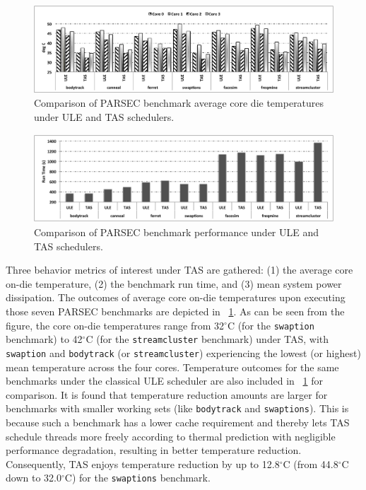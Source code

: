 \documentclass[times, 10pt,twocolumn]{IEEEtran}
\begin{document}
\begin{figure}[tbp] 
\centering
  \includegraphics[width=1.0\linewidth,height=1.3in]{graphics/parsectemp}
  \caption{Comparison of PARSEC benchmark average core die temperatures
under ULE and TAS schedulers.}
  \label{fig:pbenchmarkt}
\end{figure}
\begin{figure}[tbp]
  \includegraphics[width=1.0\linewidth,height=1.3in]{graphics/parsecperformance}
  \caption{Comparison of PARSEC benchmark performance under ULE and TAS
schedulers.}
  \label{fig:pbenchmarkp}
\end{figure} 
Three behavior metrics of interest under TAS are gathered: (1) the
average core on-die temperature, (2) the benchmark run time, and (3)
mean system power dissipation.  The outcomes of average core on-die
temperatures upon executing those seven PARSEC benchmarks are depicted
in \figurename~\ref{fig:pbenchmarkt}.  As can be seen from the figure,
the core on-die temperatures range from 32$^\circ$C (for the
\texttt{swaption} benchmark) to 42$^\circ$C (for the
\texttt{streamcluster} benchmark)
under TAS, with \texttt{swaption} and \texttt{bodytrack} (or
\texttt{streamcluster}) experiencing the lowest (or highest) mean
temperature across the four cores.  Temperature outcomes for the same
benchmarks under the classical ULE scheduler are also included in
\figurename~\ref{fig:pbenchmarkt} for comparison.  It is found that
temperature reduction amounts are larger for benchmarks with smaller
working sets (like \texttt{bodytrack} and \texttt{swaptions}).  This is
because such a benchmark has a lower cache requirement \cite{Bienia2011}
and thereby lets TAS schedule threads more freely according to thermal
prediction with negligible performance degradation, resulting in better
temperature reduction.  Consequently, TAS enjoys temperature reduction
by up to 12.8$^{\circ}$C (from 44.8$^{\circ}$C down to
32.0$^{\circ}$C) for the \texttt{swaptions} benchmark.
  
\end{document}
